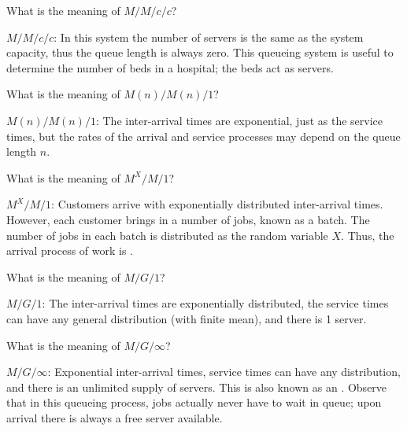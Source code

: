 \begin{extra}
 What is the meaning of $M/M/c/c$?
\begin{solution}
 $M/M/c/c$: In this system the number of servers is the same as
 the system capacity, thus the queue length is always zero. This
 queueing system is useful to determine the number of beds
 in a hospital; the beds act as servers.
\end{solution}
\end{extra}

\begin{exercise}
 What is the meaning of $M(n)/M(n)/1$?
\begin{solution}
$M(n)/M(n)/1$: The inter-arrival times are exponential, just as
 the service times, but the rates of the arrival and service processes
 may depend on the queue length $n$. 
\end{solution}
\end{exercise}


\begin{exercise}
 What is the meaning of $M^X/M/1$?
\begin{solution}
  $M^X/M/1$: Customers arrive with exponentially distributed inter-arrival times.
  However, each customer brings in a number of jobs, known as a batch.
  The number of jobs in each batch is distributed as the random variable $X$.
  Thus, the arrival process of work is .
\end{solution}
\end{exercise}

\begin{extra}
 What is the meaning of $M/G/1$?
\begin{solution}
$M/G/1$: The inter-arrival times are exponentially distributed,
 the service times can have any general distribution (with
 finite mean), and there is 1 server.
\end{solution}
\end{extra}


\begin{extra}
 What is the meaning of $M/G/\infty$?
\begin{solution}
 $M/G/\infty$: Exponential inter-arrival times, service times can
 have any distribution, and there is an unlimited supply of
 servers. This is also known as an . Observe
 that in this queueing process, jobs actually never have to wait in
 queue; upon arrival there is always a free server available.
\end{solution}
\end{extra}

